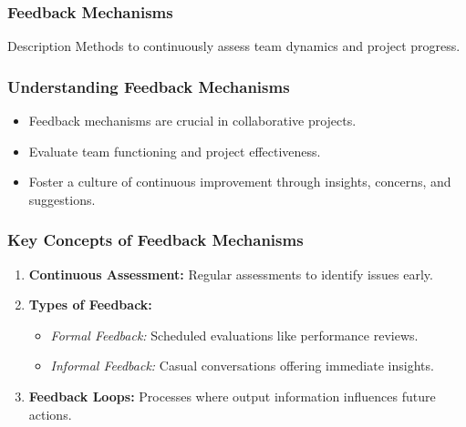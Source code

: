 \documentclass[aspectratio=169]{beamer}
\begin{document}
\begin{frame}[fragile]
    \frametitle{Feedback Mechanisms}
    \begin{block}{Description}
        Methods to continuously assess team dynamics and project progress.
    \end{block}
\end{frame}

\begin{frame}[fragile]
    \frametitle{Understanding Feedback Mechanisms}
    \begin{itemize}
        \item Feedback mechanisms are crucial in collaborative projects.
        \item Evaluate team functioning and project effectiveness.
        \item Foster a culture of continuous improvement through insights, concerns, and suggestions.
    \end{itemize}
\end{frame}

\begin{frame}[fragile]
    \frametitle{Key Concepts of Feedback Mechanisms}
    \begin{enumerate}
        \item \textbf{Continuous Assessment:} Regular assessments to identify issues early.
        \item \textbf{Types of Feedback:}
        \begin{itemize}
            \item \textit{Formal Feedback:} Scheduled evaluations like performance reviews.
            \item \textit{Informal Feedback:} Casual conversations offering immediate insights.
        \end{itemize}
        \item \textbf{Feedback Loops:} Processes where output information influences future actions.
    \end{enumerate}
\end{frame}
\end{document}
